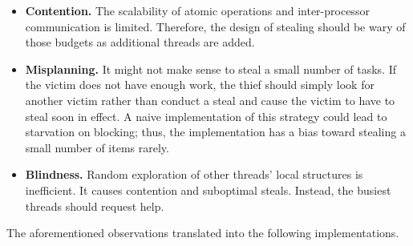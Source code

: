 \documentclass[12pt,a4paper,twoside]{report}
\begin{document}
\begin{itemize}
    \item \textbf{Contention.} The scalability of atomic operations and inter-processor communication is limited. Therefore, the design of stealing should be wary of those budgets as additional threads are added. 
    \item \textbf{Misplanning.} It might not make sense to steal a small number of tasks. If the victim does not have enough work, the thief should simply look for another victim rather than conduct a steal and cause the victim to have to steal soon in effect. A naive implementation of this strategy could lead to starvation on blocking; thus, the implementation has a bias toward stealing a small number of items rarely. 
    \item \textbf{Blindness.} Random exploration of other threads' local structures is inefficient. It causes contention and suboptimal steals. Instead, the busiest threads should request help. 
\end{itemize}

The aforementioned observations translated into the following implementations. 
\end{document}
